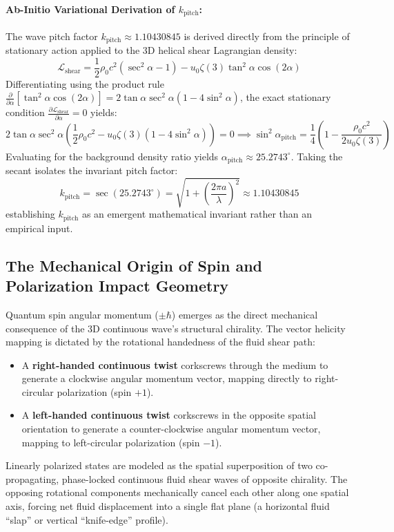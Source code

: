 \documentclass[11pt,a4paper]{article}
\begin{document}
	\paragraph{Ab-Initio Variational Derivation of $k_{\text{pitch}}$:}
	The wave pitch factor $k_{\text{pitch}} \approx 1.10430845$ is derived directly from the principle of stationary action applied to the 3D helical shear Lagrangian density:
	\begin{equation}
		\mathcal{L}_{\text{shear}} = \frac{1}{2}\rho_0 c^2 (\sec^2\alpha - 1) - u_0 \zeta(3) \tan^2\alpha \cos(2\alpha)
	\end{equation}
	Differentiating using the product rule $\frac{\partial}{\partial \alpha}\left[\tan^2\alpha \cos(2\alpha)\right] = 2\tan\alpha \sec^2\alpha (1 - 4\sin^2\alpha)$, the exact stationary condition $\frac{\partial \mathcal{L}_{\text{shear}}}{\partial \alpha} = 0$ yields:
	\begin{equation}
		2\tan\alpha \sec^2\alpha \left( \frac{1}{2}\rho_0 c^2 - u_0 \zeta(3) (1 - 4\sin^2\alpha) \right) = 0 \implies \sin^2\alpha_{\text{pitch}} = \frac{1}{4}\left(1 - \frac{\rho_0 c^2}{2 u_0 \zeta(3)}\right)
	\end{equation}
	Evaluating for the background density ratio yields $\alpha_{\text{pitch}} \approx 25.2743^\circ$. Taking the secant isolates the invariant pitch factor:
	\begin{equation}
		k_{\text{pitch}} = \sec(25.2743^\circ) = \sqrt{1 + \left(\frac{2\pi a}{\lambda}\right)^2} \approx 1.10430845
	\end{equation}
	establishing $k_{\text{pitch}}$ as an emergent mathematical invariant rather than an empirical input.
	
	\subsection{The Mechanical Origin of Spin and Polarization Impact Geometry}
	Quantum spin angular momentum ($\pm\hbar$) emerges as the direct mechanical consequence of the 3D continuous wave's structural chirality. The vector helicity mapping is dictated by the rotational handedness of the fluid shear path:
	\begin{itemize}
		\item A \textbf{right-handed continuous twist} corkscrews through the medium to generate a clockwise angular momentum vector, mapping directly to right-circular polarization (spin $+1$).
		\item A \textbf{left-handed continuous twist} corkscrews in the opposite spatial orientation to generate a counter-clockwise angular momentum vector, mapping to left-circular polarization (spin $-1$).
	\end{itemize}
	Linearly polarized states are modeled as the spatial superposition of two co-propagating, phase-locked continuous fluid shear waves of opposite chirality. The opposing rotational components mechanically cancel each other along one spatial axis, forcing net fluid displacement into a single flat plane (a horizontal fluid ``slap'' or vertical ``knife-edge'' profile).
	
\end{document}
